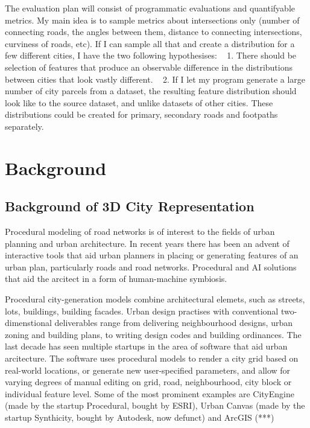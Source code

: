 \documentclass[a4paper]{article}
\begin{document}
The evaluation plan will consist of programmatic evaluations and quantifyable metrics. My main idea is to sample metrics about intersections only (number of connecting roads, the angles between them, distance to connecting intersections, curviness of roads, etc). If I can sample all that and create a distribution for a few different cities, I have the two following hypothesises:
  1. There should be selection of features that produce an observable difference in the distributions between cities that look vastly different.
  2. If I let my program generate a large number of city parcels from a dataset, the resulting feature distribution should look like to the source dataset, and unlike datasets of other cities.
These distributions could be created for primary, secondary roads and footpaths separately.

\section{Background}

\subsection{Background of 3D City Representation}

Procedural modeling of road networks is of interest to the fields of urban planning and urban architecture. In recent years there has been an advent of interactive tools that aid urban planners in placing or generating features of an urban plan, particularly roads and road networks. Procedural and AI solutions that aid the arcitect in a form of human-machine symbiosis.

Procedural city-generation models combine architectural elemets, such as streets, lots, buildings, building facades.
Urban design practises with conventional two-dimenstional deliverables range from delivering neighbourhood designs, urban zoning and building plans, to writing design codes and building ordinances.
The last decade has seen multiple startups in the area of software that aid urban arcitecture. The software uses procedural models to render a city grid based on real-world locations, or generate new user-specified parameters, and allow for varying degrees of manual editing on grid, road, neighbourhood, city block or individual feature level.
Some of the most prominent examples are CityEngine (made by the startup Procedural, bought by ESRI), Urban Canvas (made by the startup Synthicity, bought by Autodesk, now defunct) and ArcGIS (***) %
\end{document}
